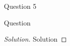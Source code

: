 \begin{solution}{Question 5}\label{ques:5}
    \begin{question}
    Question
    \end{question}
    \tcblower{}
    \begin{proof}[Solution]
        Solution
    \end{proof}
\end{solution}
